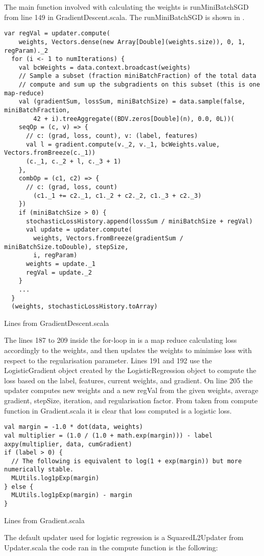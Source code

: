 The main function involved with calculating the weights is runMiniBatchSGD from line 149 in GradientDescent.scala. The runMiniBatchSGD is shown in . 
\begin{listing}[H]
\begin{verbatim}
var regVal = updater.compute(
    weights, Vectors.dense(new Array[Double](weights.size)), 0, 1, regParam)._2
  for (i <- 1 to numIterations) {
    val bcWeights = data.context.broadcast(weights)
    // Sample a subset (fraction miniBatchFraction) of the total data
    // compute and sum up the subgradients on this subset (this is one map-reduce)
    val (gradientSum, lossSum, miniBatchSize) = data.sample(false, miniBatchFraction,
        42 + i).treeAggregate((BDV.zeros[Double](n), 0.0, 0L))(
    seqOp = (c, v) => {
      // c: (grad, loss, count), v: (label, features)
      val l = gradient.compute(v._2, v._1, bcWeights.value, Vectors.fromBreeze(c._1))
      (c._1, c._2 + l, c._3 + 1)
    },
    combOp = (c1, c2) => {
      // c: (grad, loss, count)
        (c1._1 += c2._1, c1._2 + c2._2, c1._3 + c2._3)
    })
    if (miniBatchSize > 0) {
      stochasticLossHistory.append(lossSum / miniBatchSize + regVal)
      val update = updater.compute(
        weights, Vectors.fromBreeze(gradientSum / miniBatchSize.toDouble), stepSize,
        i, regParam)
      weights = update._1
      regVal = update._2
    }
    ...
  }
  (weights, stochasticLossHistory.toArray)
\end{verbatim}
\caption{Lines from GradientDescent.scala}
\label{lst:runMiniBatchSGD}
\end{listing}
The lines 187 to 209 inside the for-loop in  is a map reduce calculating loss accordingly to the weights, and then updates the weights to minimise loss with respect to the regularisation parameter. Lines 191 and 192 use the LogisticGradient object created by the LogisticRegression object to compute the loss based on the label, features, current weights, and gradient. On line 205 the updater computes new weights and a new regVal from the given weights, average gradient, stepSize, iteration, and regularisation factor.
From  taken from compute function in Gradient.scala it is clear that loss computed is a logistic loss.  
\begin{listing}[H]
\begin{verbatim}
val margin = -1.0 * dot(data, weights)
val multiplier = (1.0 / (1.0 + math.exp(margin))) - label
axpy(multiplier, data, cumGradient)
if (label > 0) {
  // The following is equivalent to log(1 + exp(margin)) but more numerically stable.
  MLUtils.log1pExp(margin)
} else {
  MLUtils.log1pExp(margin) - margin
}
\end{verbatim}
\caption{Lines from Gradient.scala}
\label{lst:sparkloss}
\end{listing}
The default updater used for logistic regression is a SquaredL2Updater from Updater.scala
the code ran in the compute function is the following:

